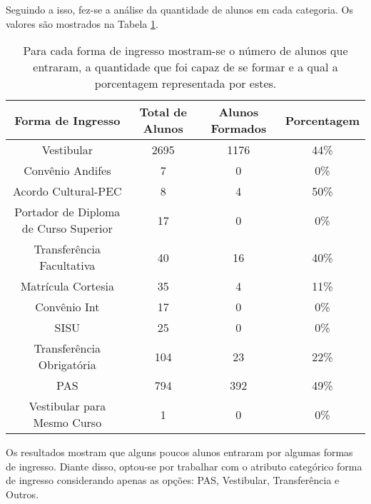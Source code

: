 Seguindo a isso, fez-se a análise da quantidade de alunos em cada categoria. Os
valores são mostrados na Tabela \ref{tab_way_in}.

\begin{table}
\begin{center}
\begin{tabular}[c]{| c | c | c | c |}
    \hline
    Forma de Ingresso & Total de Alunos & Alunos Formados & Porcentagem \\
    \hline
    Vestibular & 2695 & 1176 & 44\% \\
    \hline
    Convênio Andifes & 7 & 0 & 0\% \\
    \hline
    Acordo Cultural-PEC & 8 & 4 & 50\% \\
    \hline
    Portador de Diploma de Curso Superior & 17 & 0 & 0\% \\
    \hline
    Transferência Facultativa & 40 & 16 & 40\% \\
    \hline
    Matrícula Cortesia & 35 & 4 & 11\% \\
    \hline
    Convênio Int & 17 & 0 & 0\% \\
    \hline
    SISU & 25 & 0 & 0\% \\
    \hline
    Transferência Obrigatória & 104 & 23 & 22\% \\
    \hline
    PAS & 794 & 392 & 49\% \\
    \hline
    Vestibular para Mesmo Curso & 1 & 0 & 0\% \\
    \hline
\end{tabular}
\end{center}
\caption{Para cada forma de ingresso mostram-se o número de alunos que
entraram, a quantidade que foi capaz de se formar e a qual a porcentagem representada
por estes.}
\label{tab_way_in}
\end{table}

Os resultados mostram que alguns poucos alunos entraram por algumas formas de
ingresso. Diante disso, optou-se por trabalhar com o atributo categórico forma de
ingresso considerando apenas as opções: PAS, Vestibular, Transferência e Outros. 
 
